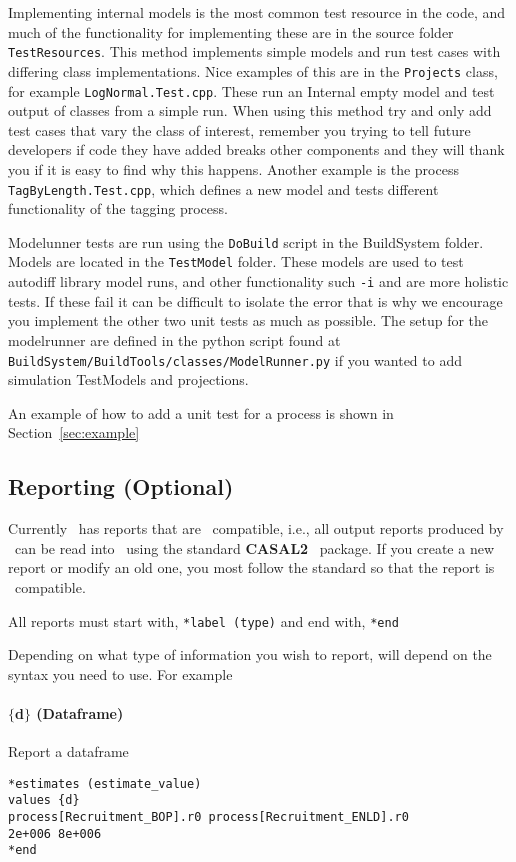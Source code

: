 Implementing internal models is the most common test resource in the code, and much of the functionality for implementing these are in the source folder \texttt{TestResources}. This method implements simple models and run test cases with differing class implementations. Nice examples of this are in the \texttt{Projects} class, for example \texttt{LogNormal.Test.cpp}. These run an Internal empty model and test output of classes from a simple run. When using this method try and only add test cases that vary the class of interest, remember you trying to tell future developers if code they have added breaks other components and they will thank you if it is easy to find why this happens. Another example is the process \texttt{TagByLength.Test.cpp}, which defines a new model and tests different functionality of the tagging process.


Modelunner tests are run using the \texttt{DoBuild} script in the BuildSystem folder. Models are located in the \texttt{TestModel} folder. These models are used to test autodiff library model runs, and other functionality such \texttt{-i} and are more holistic tests. If these fail it can be difficult to isolate the error that is why we encourage you implement the other two unit tests as much as possible. The setup for the modelrunner are defined in the python script found at \texttt{BuildSystem/BuildTools/classes/ModelRunner.py} if you wanted to add simulation TestModels and projections.


An example of how to add a unit test for a process is shown in Section~\ref{sec:example}

\subsection{Reporting (Optional)}

Currently \CNAME\ has reports that are \R\ compatible, i.e., all output reports produced by \CNAME\ can be read into \R\ using the standard  \textbf{CASAL2} \R\ package. If you create a new report or modify an old one, you most follow the standard so that the report is \R\ compatible.

All reports must start with,
\texttt{*label (type)}
and end with,
\texttt{*end}

Depending on what type of information you wish to report, will depend on the syntax you need to use. For example

\paragraph*{$\{$d$\}$ (Dataframe)}
Report a dataframe
{\small{\begin{verbatim}
*estimates (estimate_value)
values {d}
process[Recruitment_BOP].r0 process[Recruitment_ENLD].r0 
2e+006 8e+006
*end
\end{verbatim}}}

